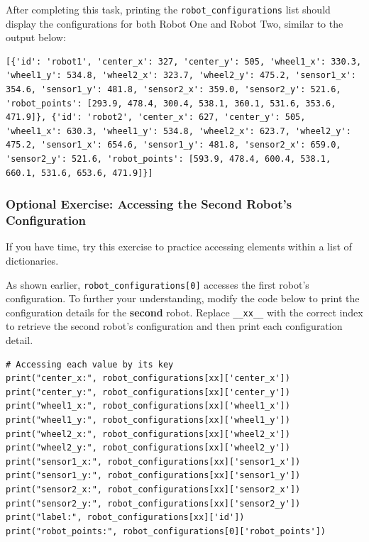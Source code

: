After completing this task, printing the \texttt{robot\_configurations} list should display the configurations for both Robot One and Robot Two, similar to the output below:

\begin{verbatim}
[{'id': 'robot1', 'center_x': 327, 'center_y': 505, 'wheel1_x': 330.3, 'wheel1_y': 534.8, 'wheel2_x': 323.7, 'wheel2_y': 475.2, 'sensor1_x': 354.6, 'sensor1_y': 481.8, 'sensor2_x': 359.0, 'sensor2_y': 521.6, 'robot_points': [293.9, 478.4, 300.4, 538.1, 360.1, 531.6, 353.6, 471.9]}, {'id': 'robot2', 'center_x': 627, 'center_y': 505, 'wheel1_x': 630.3, 'wheel1_y': 534.8, 'wheel2_x': 623.7, 'wheel2_y': 475.2, 'sensor1_x': 654.6, 'sensor1_y': 481.8, 'sensor2_x': 659.0, 'sensor2_y': 521.6, 'robot_points': [593.9, 478.4, 600.4, 538.1, 660.1, 531.6, 653.6, 471.9]}]
\end{verbatim}


\subsubsection{Optional Exercise: Accessing the Second Robot's Configuration}

If you have time, try this exercise to practice accessing elements within a list of dictionaries.

As shown earlier, \texttt{robot\_configurations[0]} accesses the first robot's configuration. To further your understanding, modify the code below to print the configuration details for the \textbf{second} robot. Replace \texttt{\_\_xx\_\_} with the correct index to retrieve the second robot's configuration and then print each configuration detail.




\begin{verbatim}
# Accessing each value by its key
print("center_x:", robot_configurations[xx]['center_x'])
print("center_y:", robot_configurations[xx]['center_y'])
print("wheel1_x:", robot_configurations[xx]['wheel1_x'])
print("wheel1_y:", robot_configurations[xx]['wheel1_y'])
print("wheel2_x:", robot_configurations[xx]['wheel2_x'])
print("wheel2_y:", robot_configurations[xx]['wheel2_y'])
print("sensor1_x:", robot_configurations[xx]['sensor1_x'])
print("sensor1_y:", robot_configurations[xx]['sensor1_y'])
print("sensor2_x:", robot_configurations[xx]['sensor2_x'])
print("sensor2_y:", robot_configurations[xx]['sensor2_y'])
print("label:", robot_configurations[xx]['id'])
print("robot_points:", robot_configurations[0]['robot_points'])
\end{verbatim}

\newpage

